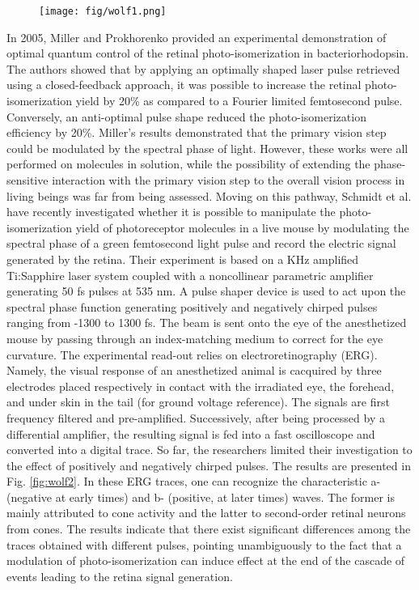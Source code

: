 \documentclass[journal=jacsat,manuscript=article]{achemso}
\begin{document}
\begin{figure}
\texttt{[image: fig/wolf1.png]}
\caption{        }
\label{fig:wolf1}
\end{figure}


In 2005, Miller and Prokhorenko provided an experimental demonstration
of optimal quantum control of the retinal photo-isomerization in
bacteriorhodopsin.\cite{miller:2005} The authors showed that by
applying an optimally shaped laser pulse retrieved using a
closed-feedback approach, it was possible to increase the retinal
photo-isomerization yield by 20\% as compared to a Fourier limited
femtosecond pulse. Conversely, an anti-optimal pulse shape reduced the
photo-isomerization efficiency by 20\%. Miller’s results demonstrated
that the primary vision step could be modulated by the spectral phase
of light. However, these works were all performed on molecules in
solution, while the possibility of extending the phase-sensitive
interaction with the primary vision step to the overall vision process
in living beings was far from being assessed.  Moving on this pathway,
Schmidt et al. have recently investigated whether it is possible to
manipulate the photo-isomerization yield of photoreceptor molecules in
a live mouse by modulating the spectral phase of a green femtosecond
light pulse and record the electric signal generated by the
retina. Their experiment is based on a KHz amplified Ti:Sapphire laser
system coupled with a noncollinear parametric amplifier generating 50
fs pulses at 535 nm. A pulse shaper device is used to act upon the
spectral phase function generating positively and negatively chirped
pulses ranging from -1300 to 1300 fs. The beam is sent onto the eye of
the anesthetized mouse by passing through an index-matching medium to
correct for the eye curvature. The experimental read-out relies on
electroretinography (ERG). Namely, the visual response of an
anesthetized animal is cacquired by three electrodes placed
respectively in contact with the irradiated eye, the forehead, and
under skin in the tail (for ground voltage reference). The signals are
first frequency filtered and pre-amplified. Successively, after being
processed by a differential amplifier, the resulting signal is fed
into a fast oscilloscope and converted into a digital trace. So far,
the researchers limited their investigation to the effect of
positively and negatively chirped pulses. The results are presented in
Fig. \ref{fig:wolf2}. In these ERG traces, one can recognize the
characteristic a- (negative at early times) and b- (positive, at later
times) waves. The former is mainly attributed to cone activity and the
latter to second-order retinal neurons from cones. The results
indicate that there exist significant differences among the traces
obtained with different pulses, pointing unambiguously to the fact
that a modulation of photo-isomerization can induce effect at the end
of the cascade of events leading to the retina signal generation.
\end{document}
